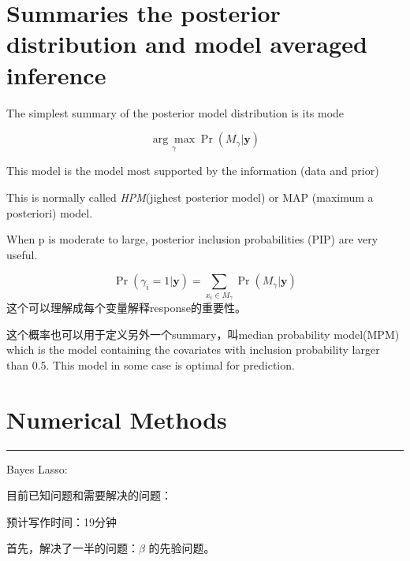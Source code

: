 \documentclass[
]{book}
\theoremstyle{definition}
\theoremstyle{definition}
\theoremstyle{definition}
\theoremstyle{remark}
\begin{document}
\hypertarget{summaries-the-posterior-distribution-and-model-averaged-inference}{%
\section{Summaries the posterior distribution and model averaged inference}\label{summaries-the-posterior-distribution-and-model-averaged-inference}}

The simplest summary of the posterior model distribution is its mode

\[
\underset{\gamma}{\arg \max } \operatorname{Pr}\left(M_{\gamma} | \boldsymbol{y}\right)
\]

This model is the model most supported by the information (data and prior)

This is normally called \emph{HPM}(jighest posterior model) or MAP (maximum a posteriori) model.

When p is moderate to large, posterior inclusion probabilities (PIP) are very useful.

\[
\operatorname{Pr}\left(\gamma_{i}=1 | \boldsymbol{y}\right)=\sum_{x_{i} \in M_{\gamma}} \operatorname{Pr}\left(M_{\gamma} | \boldsymbol{y}\right)
\]
这个可以理解成每个变量解释response的重要性。

这个概率也可以用于定义另外一个summary，叫median probability model(MPM) which is the model containing the covariates with inclusion probability larger than 0.5. This model in some case is optimal for prediction.

\hypertarget{numerical-methods}{%
\section{Numerical Methods}\label{numerical-methods}}

\begin{center}\rule{0.5\linewidth}{0.5pt}\end{center}

Bayes Lasso:

目前已知问题和需要解决的问题：

预计写作时间：19分钟

首先，解决了一半的问题：\(\beta\) 的先验问题。
\end{document}
